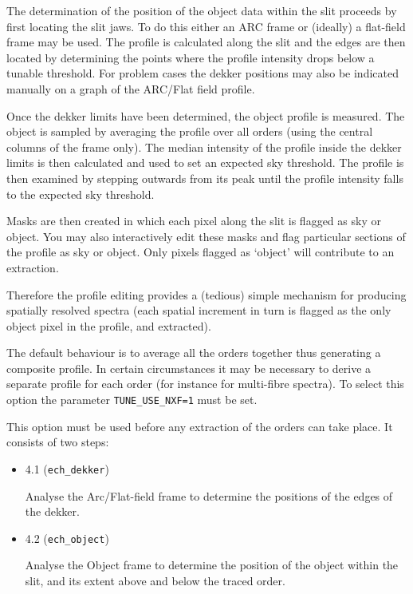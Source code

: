 \documentclass[11pt,twoside]{article}
\makeatletter
\newcommand{\htmlref}[2]{#1}
\newcommand{\xlabel}[1]{}
\newcommand{\mlabel}[1]{\xlabel{#1}\label{#1}}
\newcommand{\myindex}[1]{\index{#1}}
\newcommand{\indexcmdname}[1]{\index{#1@\protect\cmdname{#1}}}
\renewcommand{\myindex}[1]{}
\renewcommand{\indexcmdname}[1]{}
\newcommand{\cmdname}{\begingroup \catcode`\_=12 \realcmdname}
\newcommand{\realcmdname}[1]{\endgroup\texttt{#1}}
\makeatother
\begin{document}
The determination of the position of the object data within the slit
proceeds by first locating the slit jaws. To do this either an ARC frame
or (ideally) a flat-field frame may be used. The profile is calculated
along the slit and the edges are then located by determining the points
where the profile intensity drops below a tunable threshold. For
problem cases the dekker positions may also be indicated manually on a
graph of the ARC/Flat field profile.
\myindex{Flat field!defines dekker}
Once the dekker limits have been determined, the object profile is
measured. The object is sampled by averaging the profile over all orders
(using the central columns of the frame only). The median intensity of
the profile inside the dekker limits is then calculated and used to set
an expected sky threshold. The profile is then examined by stepping
outwards from its peak until the profile intensity falls to the expected
sky threshold.
\myindex{Masks!sky/object}
Masks are then created in which
each pixel along the slit is flagged as sky or object. You may also
interactively edit these masks and flag particular sections of the
profile as sky or object. Only pixels flagged as `object' will
contribute to an extraction.
\myindex{Spatially resolved spectra}
Therefore the profile editing provides a (tedious) simple mechanism for
producing spatially resolved spectra (each spatial increment in turn is
flagged as the only object pixel in the profile, and extracted).

The default behaviour is to average all the orders together thus
generating a composite profile. In certain circumstances it may be
necessary to derive a separate profile for each order (for instance for
multi-fibre spectra).  To select this option the parameter
\htmlref{{\tt TUNE\_USE\_NXF=1}}{par_TUNE_USE_NXF} must be set.
\indexcmdname{TUNE_USE_NXF}

This option must be used before any extraction of the orders can take
place. It consists of two steps:

\begin{itemize}

\item \mlabel{ech_dekker} {4.1} (\texttt{ech\_dekker})

      Analyse the Arc/Flat-field frame to determine the positions
      of the edges of the dekker.

\item \mlabel{ech_object} {4.2} (\texttt{ech\_object})

      Analyse the Object frame to determine the position of the
      object within the slit, and its extent above and below the
      traced order.

\end{itemize}
\end{document}
